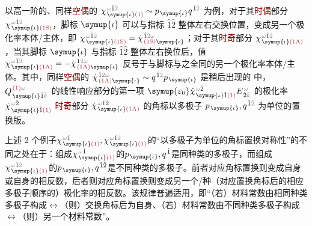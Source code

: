 以高一阶的、同样\textcolor{Maroon}{空偶}的 $\chi^{\;\! \mathcolor{gray}{\omega} \hat{1} \mathcolor{gray}{\hat{2}}}_{\;\! \symup{\iota} \textcolor{Maroon}{(1)}} \sim p_{\;\! \symup{\iota}} q^{\;\! \hat{1} \mathcolor{gray}{\hat{2}}}$ 为例，对于其\textcolor{Maroon}{时偶}部分$\chi^{\;\! \mathcolor{gray}{\omega} \hat{1} \mathcolor{gray}{\hat{2}}}_{\;\! \symup{\iota} \textcolor{Maroon}{(1\text{S})}}$，脚标 $\symup{\iota}$ 可以与指标 $\hat{1} \hat{2}$ 整体左右交换位置，变成另一个极化率本体/主体，即 $\chi^{\;\! \mathcolor{gray}{\omega} \hat{1} \mathcolor{gray}{\hat{2}}}_{\;\! \symup{\iota} \textcolor{Maroon}{(1\text{S})}} = \dot{\chi}^{\;\! \hat{1} \mathcolor{gray}{\hat{2}} \mathcolor{gray}{\omega} }_{\;\! \textcolor{Maroon}{(1\text{S})} \symup{\iota}}$；对于其\textcolor{Maroon}{时奇}部分 $\chi^{\;\! \mathcolor{gray}{\omega} \hat{1} \mathcolor{gray}{\hat{2}}}_{\;\! \symup{\iota} \textcolor{Maroon}{(1\text{A})}}$，当其脚标 $\symup{\iota}$ 与指标 $\hat{1} \hat{2}$ 整体左右换位后，值 $\chi^{\;\! \mathcolor{gray}{\omega} \hat{1} \mathcolor{gray}{\hat{2}}}_{\;\! \symup{\iota} \textcolor{Maroon}{(1\text{A})}} = - \dot{\chi}^{\;\! \hat{1} \mathcolor{gray}{\hat{2}} \mathcolor{gray}{\omega} }_{\;\! \textcolor{Maroon}{(1\text{A})} \symup{\iota}}$ 反号于与脚标与之全同的另一个极化率本体/主体\cite{raabMultipoleTheoryElectromagnetism2004}。其中，同样\textcolor{Maroon}{空偶}的 $\dot{\chi}^{\;\! \hat{1} \mathcolor{gray}{\hat{2}} \mathcolor{gray}{\omega} }_{\;\! \textcolor{Maroon}{(1\text{A})} \symup{\iota}} \sim q^{\;\! \hat{1} \mathcolor{gray}{\hat{2}}} p_{\;\! \symup{\iota}}$ 是稍后出现的  中，$Q^{\;\! \textcolor{Maroon}{(1)} \mathcolor{gray}{\omega}}_{\;\! \symup{\iota} \hat{1} \mathcolor{gray}{\bar{k}}}$ 的线性响应部分的第一项 ${\symup{\varepsilon_0}} \dot{\chi}^{\;\! \mathcolor{gray}{\omega} \hat{2}}_{\;\! \symup{\iota} \hat{1} \textcolor{Maroon}{(1)}} E^{\;\!\mathcolor{gray}{\omega}}_{\;\! \hat{2} \mathcolor{gray}{\bar{k}}}$ 的极化率 $\dot{\chi}^{\;\! \mathcolor{gray}{\omega} \hat{2}}_{\;\! \symup{\iota} \hat{1} \textcolor{Maroon}{(1)}}$ \textcolor{Maroon}{时奇}部分 $\dot{\chi}^{\;\! \mathcolor{gray}{\omega} \hat{1} \hat{2}}_{\;\! \symup{\iota} \textcolor{Maroon}{(1\text{A})}}$ 的角标以多极子 $p_{\;\! \symup{\iota}}, q^{\;\! \hat{1} \mathcolor{gray}{\hat{2}}}$ 为单位的置换版。

上述 2 个例子$\chi^{\;\! \mathcolor{gray}{\omega} \hat{1}}_{\;\! \symup{\iota} \textcolor{Maroon}{(1)}}, \chi^{\;\! \mathcolor{gray}{\omega} \hat{1} \mathcolor{gray}{\hat{2}}}_{\;\! \symup{\iota} \textcolor{Maroon}{(1)}}$的“以多极子为单位的角标置换对称性”的不同之处在于：组成$\chi^{\;\! \mathcolor{gray}{\omega} \hat{1}}_{\;\! \symup{\iota} \textcolor{Maroon}{(1)}}$的$p_{\;\! \symup{\iota}}, q^{\;\! \hat{1}}$是同种类的多极子，而组成$\chi^{\;\! \mathcolor{gray}{\omega} \hat{1} \mathcolor{gray}{\hat{2}}}_{\;\! \symup{\iota} \textcolor{Maroon}{(1)}}$的$p_{\;\! \symup{\iota}}, q^{\;\! \hat{1} \hat{2}}$是不同种类的多极子。前者对应角标置换则变成自身或自身的相反数，后者则对应角标置换则变成另一个/种（对应置换角标后的相应多极子顺序的）极化率的相反数。该规律普遍适用，即“（若）材料常数由相同种类多极子构成$\longleftrightarrow$（则）交换角标后为自身、（若）材料常数由不同种类多极子构成$\longleftrightarrow$（则）另一个材料常数”。

